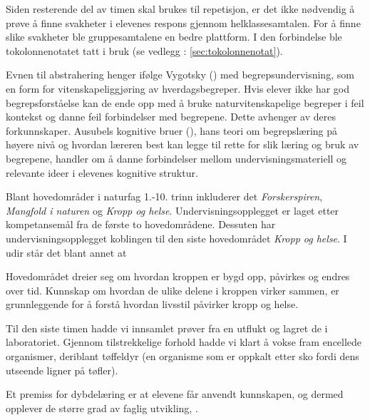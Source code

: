\documentclass[main.tex]{subfiles}
\begin{document}



Siden resterende del av timen skal brukes til repetisjon, er det ikke nødvendig å 
prøve å finne svakheter i elevenes respons gjennom helklassesamtalen. For å finne slike svakheter 
ble gruppesamtalene en bedre plattform. I den forbindelse ble tokolonnenotatet tatt i bruk (se 
vedlegg : \ref{sec:tokolonnenotat}).

Evnen til abstrahering henger ifølge Vygotsky () med begrepsundervisning, som en
form for vitenskapeliggjøring av hverdagsbegreper. Hvis elever ikke har god begrepsforståelse
kan de ende opp med å bruke naturvitenskapelige begreper i feil kontekst og danne feil 
forbindelser med begrepene. Dette avhenger av deres forkunnskaper. Ausubels kognitive bruer 
(), hans teori om begrepslæring på høyere nivå og hvordan læreren best kan legge 
til rette for slik læring og bruk av begrepene,  handler om å danne forbindelser mellom undervisningsmateriell
og relevante ideer i elevenes kognitive struktur.

Blant hovedområder i naturfag 1.-10. trinn inkluderer det \emph{Forskerspiren}, \emph{Mangfold i naturen} og \emph{Kropp og helse}. Undervisningsopplegget er laget etter kompetansemål fra de første to hovedområdene. Dessuten har undervisningsopplegget koblingen til den siste hovedområdet \emph{Kropp og helse}. I udir står det blant annet at
\begin{displayquote}
Hovedområdet dreier seg om hvordan kroppen er bygd opp, påvirkes og endres over tid. Kunnskap om hvordan de ulike delene i kroppen virker sammen, er grunnleggende for å forstå hvordan livsstil påvirker kropp og helse. 

\end{displayquote}

Til den siste timen hadde vi innsamlet prøver fra en utflukt og lagret de i laboratoriet. 
Gjennom tilstrekkelige forhold hadde vi klart å vokse fram encellede organismer, deriblant tøffeldyr 
(en organisme som er oppkalt etter sko fordi dens utseende ligner på tøfler).

Et premiss for dybdelæring er at elevene får anvendt kunnskapen, og dermed opplever de større grad av faglig utvikling, .
\end{document}
